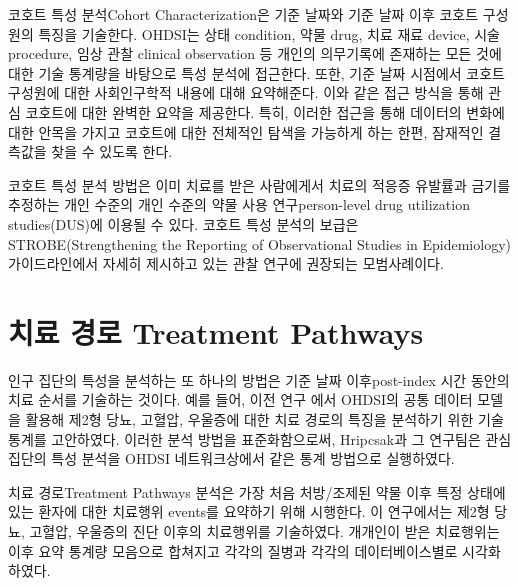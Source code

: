 \documentclass[10.5pt]{book}
\theoremstyle{definition}
\theoremstyle{definition}
\theoremstyle{definition}
\theoremstyle{remark}
\begin{document}
코호트 특성 분석Cohort Characterization은 기준 날짜와 기준 날짜 이후
코호트 구성원의 특징을 기술한다. OHDSI는 상태 condition, 약물 drug, 치료
재료 device, 시술 procedure, 임상 관찰 clinical observation 등 개인의
의무기록에 존재하는 모든 것에 대한 기술 통계량을 바탕으로 특성 분석에
접근한다. 또한, 기준 날짜 시점에서 코호트 구성원에 대한 사회인구학적
내용에 대해 요약해준다. 이와 같은 접근 방식을 통해 관심 코호트에 대한
완벽한 요약을 제공한다. 특히, 이러한 접근을 통해 데이터의 변화에 대한
안목을 가지고 코호트에 대한 전체적인 탐색을 가능하게 하는 한편, 잠재적인
결측값을 찾을 수 있도록 한다.

코호트 특성 분석 방법은 이미 치료를 받은 사람에게서 치료의 적응증
유발률과 금기를 추정하는 개인 수준의 개인 수준의 약물 사용
연구person-level drug utilization studies(DUS)에 이용될 수 있다. 코호트
특성 분석의 보급은 STROBE(Strengthening the Reporting of Observational
Studies in Epidemiology) 가이드라인에서 자세히 제시하고 있는 관찰 연구에
권장되는 모범사례이다. \citep{VONELM2008344}

\section{치료 경로 Treatment Pathways}\label{--treatment-pathways}

인구 집단의 특성을 분석하는 또 하나의 방법은 기준 날짜 이후post-index
시간 동안의 치료 순서를 기술하는 것이다. 예를 들어, 이전 연구
\citep{Hripcsak7329} 에서 OHDSI의 공통 데이터 모델을 활용해 제2형 당뇨,
고혈압, 우울증에 대한 치료 경로의 특징을 분석하기 위한 기술 통계를
고안하였다. 이러한 분석 방법을 표준화함으로써, Hripcsak과 그 연구팀은
관심 집단의 특성 분석을 OHDSI 네트워크상에서 같은 통계 방법으로
실행하였다. 

치료 경로Treatment Pathways 분석은 가장 처음 처방/조제된 약물 이후 특정
상태에 있는 환자에 대한 치료행위 events를 요약하기 위해 시행한다. 이
연구에서는 제2형 당뇨, 고혈압, 우울증의 진단 이후의 치료행위를
기술하였다. 개개인이 받은 치료행위는 이후 요약 통계량 모음으로 합쳐지고
각각의 질병과 각각의 데이터베이스별로 시각화하였다.
\end{document}
